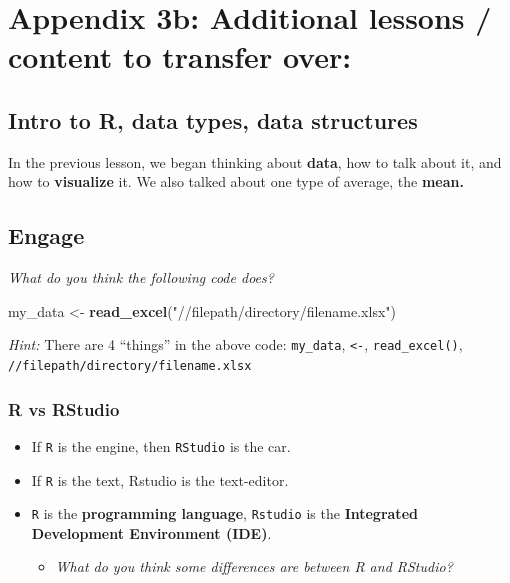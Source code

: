 \documentclass[
]{book}
\newenvironment{Shaded}{\begin{snugshade}}{\end{snugshade}}
\newcommand{\FunctionTok}[1]{\textcolor[rgb]{0.13,0.29,0.53}{\textbf{#1}}}
\newcommand{\NormalTok}[1]{#1}
\newcommand{\OtherTok}[1]{\textcolor[rgb]{0.56,0.35,0.01}{#1}}
\newcommand{\StringTok}[1]{\textcolor[rgb]{0.31,0.60,0.02}{#1}}
\providecommand{\tightlist}{%
  \setlength{\itemsep}{0pt}\setlength{\parskip}{0pt}}
\begin{document}
\hypertarget{appendix-3b-additional-lessons-content-to-transfer-over}{%
\chapter*{Appendix 3b: Additional lessons / content to transfer over:}\label{appendix-3b-additional-lessons-content-to-transfer-over}}

\hypertarget{intro-to-r-data-types-data-structures}{%
\section*{Intro to R, data types, data structures}\label{intro-to-r-data-types-data-structures}}

In the previous lesson, we began thinking about \textbf{data}, how to talk about it,
and how to \textbf{visualize} it. We also talked about one type of average, the \textbf{mean.}

\hypertarget{engage-5}{%
\section*{Engage}\label{engage-5}}

\emph{What do you think the following code does?}

\begin{Shaded}
\begin{Highlighting}[]
\NormalTok{my\_data }\OtherTok{\textless{}{-}} \FunctionTok{read\_excel}\NormalTok{(}\StringTok{"//filepath/directory/filename.xlsx"}\NormalTok{)}
\end{Highlighting}
\end{Shaded}

\emph{Hint:} There are 4 ``things'' in the above code:
\texttt{my\_data},
\texttt{\textless{}-},
\texttt{read\_excel()},
\texttt{//filepath/directory/filename.xlsx}

\hypertarget{r-vs-rstudio-1}{%
\subsection{R vs RStudio}\label{r-vs-rstudio-1}}

\begin{itemize}
\item
  If \texttt{R} is the engine, then \texttt{RStudio} is the car.
\item
  If \texttt{R} is the text, Rstudio is the text-editor.
\item
  \texttt{R} is the \textbf{programming language}, \texttt{Rstudio} is the \textbf{Integrated Development Environment (IDE)}.

  \begin{itemize}
  \tightlist
  \item
    \emph{What do you think some differences are between R and RStudio?}
  \end{itemize}
\end{itemize}
\end{document}
